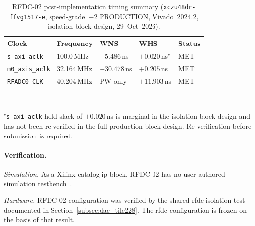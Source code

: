 \vspace{-30pt}\leavevmode\par
\begin{table}[!h]
  \caption{RFDC-02 post-implementation timing summary
           (\texttt{xczu48dr\allowbreak-ffvg1517\allowbreak-e}, speed-grade~$-2$
           PRODUCTION, Vivado~2024.2, isolation block design,
           29~Oct~2026).}
  \label{tab:rfdc02_timing}
  \centering
  \begin{tabular}{lllll}
    \hline
    Clock & Frequency & WNS & WHS & Status \\
    \hline
    \texttt{s\_axi\_aclk}
      & 100.0\,MHz
      & $+5.486$\,ns
      & $+0.020$\,ns$^{c}$
      & MET \\[2pt]
    \texttt{m0\_axis\_aclk}
      & 32.164\,MHz
      & $+30.478$\,ns
      & $+0.205$\,ns
      & MET \\[2pt]
    \texttt{RFADC0\_CLK}
      & 40.204\,MHz
      & PW only
      & $+11.903$\,ns
      & MET \\
    \hline
  \end{tabular}\\[4pt]
  \begin{minipage}{\linewidth}
    \small
    $^{c}$\texttt{s\_axi\_aclk} hold slack of $+0.020$\,ns is
    marginal in the isolation block design and has not been
    re-verified in the full production block design.
    Re-verification before submission is required.
  \end{minipage}
\end{table}

\FloatBarrier


\paragraph{Verification.}

\textit{Simulation.}
As a Xilinx catalog \ac{ip} block, RFDC-02 has no user-authored
simulation testbench~\cite{AMD_PG269}.

\textit{Hardware.}
RFDC-02 configuration was verified by the shared \ac{rfdc} isolation
test documented in Section~\ref{subsec:dac_tile228}.
The \ac{rfdc} configuration is frozen on the basis of that result.

\clearpage


